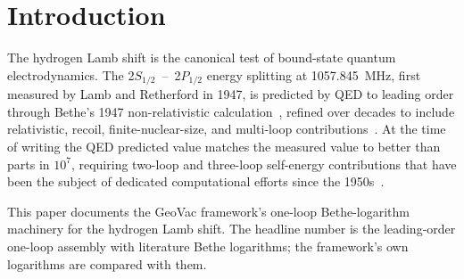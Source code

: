\documentclass[11pt]{article}
\begin{document}
\begin{abstract}
Sprint LS-7 (May 2026) made a first pass at the two-loop self-energy
on Dirac-$S^3$ via iterated CC spectral action: the pre-factor
$(\alpha/\pi)^2 (Z\alpha)^4 / n^3$ of the dominant two-loop SE piece
emerges from iterated proper-time integration, consistent with Paper~35's
Prediction~1 at the structural level.  An LS-7 decomposition of the
residual into multi-loop and non-loop pieces is withdrawn: its rows do
not sum to its stated totals and it omits the one-loop
$\alpha(Z\alpha)^5$ term; the residual's attribution is open.

The framework's Bethe-logarithm machinery is built from projections
that each have a literature precedent: the Coulomb Sturmian basis at
exponent $\lambda = Z/n$ (the Fock label set re-parameterized for
bound-state space; Paper~7) and the Drake--Swainson
asymptotic-subtraction projection (Paper~34 \S\,III.13).  No
GeoVac-specific fitting parameter enters.
\end{abstract}

\section{Introduction}
\label{sec:intro}

The hydrogen Lamb shift is the canonical test of bound-state quantum
electrodynamics.  The 2$S_{1/2}$~--~2$P_{1/2}$ energy splitting at
1057.845~MHz, first measured by Lamb and Retherford in 1947, is
predicted by QED to leading order through Bethe's 1947 non-relativistic
calculation~\cite{bethe1947}, refined over decades to include
relativistic, recoil, finite-nuclear-size, and multi-loop
contributions~\cite{eides2001}.  At the time of writing the QED
predicted value matches the measured value to better than parts in
$10^7$, requiring two-loop and three-loop self-energy contributions
that have been the subject of dedicated computational efforts since
the 1950s~\cite{mohr_plunien_soff}.

This paper documents the GeoVac framework's one-loop Bethe-logarithm
machinery for the hydrogen Lamb shift.  The headline number is the
leading-order one-loop assembly with literature Bethe logarithms; the
framework's own logarithms are compared with them.
\end{document}

